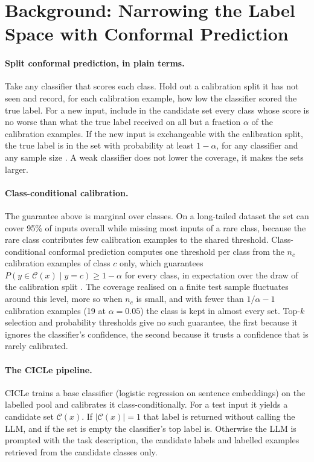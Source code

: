 \section{Background: Narrowing the Label Space with Conformal Prediction}
\label{sec:background}

\paragraph{Split conformal prediction, in plain terms.}
Take any classifier that scores each class.
Hold out a calibration split it has not seen and record, for each calibration example, how low the classifier scored the true label.
For a new input, include in the candidate set every class whose score is no worse than what the true label received on all but a fraction $\alpha$ of the calibration examples.
If the new input is exchangeable with the calibration split, the true label is in the set with probability at least $1-\alpha$, for any classifier and any sample size \citep{vovk2005algorithmic,papadopoulos2002inductive}.
A weak classifier does not lower the coverage, it makes the sets larger.

\paragraph{Class-conditional calibration.}
The guarantee above is marginal over classes.
On a long-tailed dataset the set can cover 95\% of inputs overall while missing most inputs of a rare class, because the rare class contributes few calibration examples to the shared threshold.
Class-conditional conformal prediction computes one threshold per class from the $n_c$ calibration examples of class $c$ only, which guarantees $P(y \in \mathcal{C}(x) \mid y = c) \geq 1-\alpha$ for every class, in expectation over the draw of the calibration split \citep{vovk2012conditional}.
The coverage realised on a finite test sample fluctuates around this level, more so when $n_c$ is small, and with fewer than $1/\alpha - 1$ calibration examples (19 at $\alpha = 0.05$) the class is kept in almost every set.
Top-$k$ selection and probability thresholds give no such guarantee, the first because it ignores the classifier's confidence, the second because it trusts a confidence that is rarely calibrated.

\paragraph{The CICLe pipeline.}
CICLe \citep{randl2024cicle} trains a base classifier (logistic regression on sentence embeddings) on the labelled pool and calibrates it class-conditionally.
For a test input it yields a candidate set $\mathcal{C}(x)$.
If $|\mathcal{C}(x)| = 1$ that label is returned without calling the LLM, and if the set is empty the classifier's top label is.
Otherwise the LLM is prompted with the task description, the candidate labels and labelled examples retrieved from the candidate classes only.

